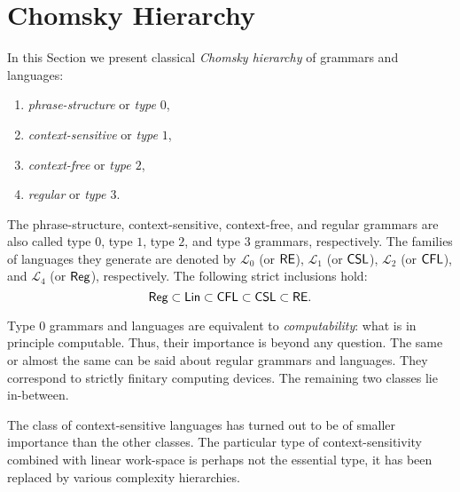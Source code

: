 \section{Chomsky Hierarchy}
\label{section:chomsky-hierarchy}

In this Section we present classical \emph{Chomsky hierarchy} of grammars and languages:

\begin{enumerate}
\item {}\emph{phrase-structure} or \emph{type $0$},
\item {}\emph{context-sensitive} or \emph{type $1$},
\item {}\emph{context-free} or \emph{type $2$},
\item {}\emph{regular} or \emph{type $3$}.
\end{enumerate}

The phrase-structure, context-sensitive, context-free, and regular grammars are also called type $0$, type $1$, type $2$, and type $3$ grammars, respectively. The families of languages they generate are denoted by 
$\mathcal{L}_0$ (or \index{$\RE$}$\RE$),
$\mathcal{L}_1$ (or \index{$\CSL$}$\CSL$), 
$\mathcal{L}_2$ (or \index{$\CFL$}$\CFL$), and 
$\mathcal{L}_4$ (or \index{$\Reg$}$\Reg$), respectively.
The following strict inclusions hold: $$\textup{\sf Reg} \subset \textup{\sf Lin} \subset \textup{\sf CFL} \subset \textup{\sf CSL} \subset \textup{\sf RE}.$$

Type $0$ grammars and languages are equivalent to \emph{computability}: what is in principle computable. Thus, their importance is beyond any question. The same or almost the same can be said about regular grammars and languages. They correspond to strictly finitary computing devices. The remaining two classes lie in-between.

The class of context-sensitive languages has turned out to be of smaller importance than the other classes. The particular type of context-sensitivity combined with linear work-space is perhaps not the essential type, it has been replaced by various complexity hierarchies.

